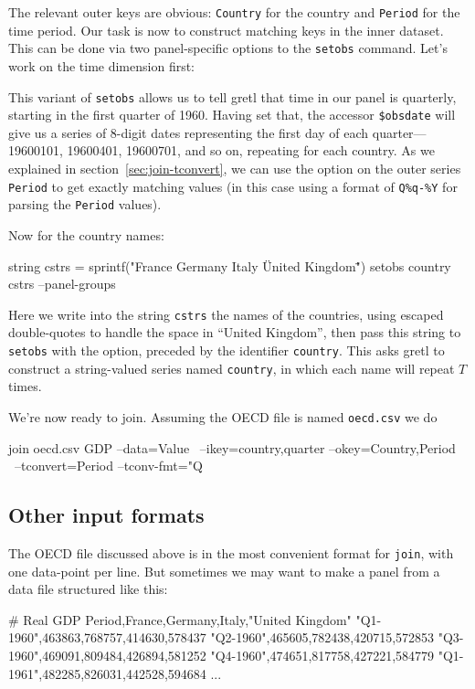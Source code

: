 The relevant outer keys are obvious: \texttt{Country} for the country
and \texttt{Period} for the time period. Our task is now to construct
matching keys in the inner dataset. This can be done via two
panel-specific options to the \texttt{setobs} command. Let's work on
the time dimension first:
This variant of \texttt{setobs} allows us to tell gretl that time in
our panel is quarterly, starting in the first quarter of 1960. Having
set that, the accessor \verb|$obsdate| will give us a series of
8-digit dates representing the first day of each quarter---19600101,
19600401, 19600701, and so on, repeating for each country. As we
explained in section~\ref{sec:join-tconvert}, we can use the
 option on the outer series \texttt{Period} to get
exactly matching values (in this case using a format of \verb|Q%q-%Y|
for parsing the \texttt{Period} values).

Now for the country names:
\begin{code}
string cstrs = sprintf("France Germany Italy \"United Kingdom\"")
setobs country cstrs --panel-groups
\end{code}
Here we write into the string \texttt{cstrs} the names of the
countries, using escaped double-quotes to handle the space in ``United
Kingdom'', then pass this string to \texttt{setobs} with the
 option, preceded by the identifier
\texttt{country}. This asks gretl to construct a string-valued series
named \texttt{country}, in which each name will repeat $T$ times.

We're now ready to join. Assuming the OECD file is named
\texttt{oecd.csv} we do
\begin{code}
join oecd.csv GDP --data=Value \
 --ikey=country,quarter --okey=Country,Period \
 --tconvert=Period --tconv-fmt="Q%
\end{code}

\subsection{Other input formats}

The OECD file discussed above is in the most convenient format for
\texttt{join}, with one data-point per line. But sometimes we may want
to make a panel from a data file structured like this:
\begin{code}
# Real GDP
Period,France,Germany,Italy,"United Kingdom"
"Q1-1960",463863,768757,414630,578437
"Q2-1960",465605,782438,420715,572853
"Q3-1960",469091,809484,426894,581252
"Q4-1960",474651,817758,427221,584779
"Q1-1961",482285,826031,442528,594684
...
\end{code}

